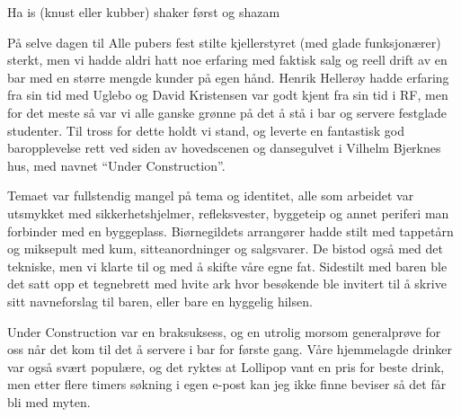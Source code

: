 Ha is (knust eller kubber) shaker først og shazam

På selve dagen til Alle pubers fest stilte kjellerstyret (med glade funksjonærer) sterkt, men vi hadde aldri hatt noe erfaring med faktisk salg og reell drift av en bar med en større mengde kunder på egen hånd. Henrik Hellerøy hadde erfaring fra sin tid med Uglebo og David Kristensen var godt kjent fra sin tid i RF, men for det meste så var vi alle ganske grønne på det å stå i bar og servere festglade studenter. Til tross for dette holdt vi stand, og leverte en fantastisk god baropplevelse rett ved siden av hovedscenen og dansegulvet i Vilhelm Bjerknes hus, med navnet ``Under Construction''. 

Temaet var fullstendig mangel på tema og identitet, alle som arbeidet var utsmykket med sikkerhetshjelmer, refleksvester, byggeteip og annet periferi man forbinder med en byggeplass. Biørnegildets arrangører hadde stilt med tappetårn og miksepult med kum, sitteanordninger og salgsvarer. De bistod også med det tekniske, men vi klarte til og med å skifte våre egne fat. Sidestilt med baren ble det satt opp et tegnebrett med hvite ark hvor besøkende ble invitert til å skrive sitt navneforslag til baren, eller bare en hyggelig hilsen.

Under Construction var en braksuksess, og en utrolig morsom generalprøve for oss når det kom til det å servere i bar for første gang. Våre hjemmelagde drinker var også svært populære, og det ryktes at Lollipop vant en pris for beste drink, men etter flere timers søkning i egen e-post kan jeg ikke finne beviser så det får bli med myten.
